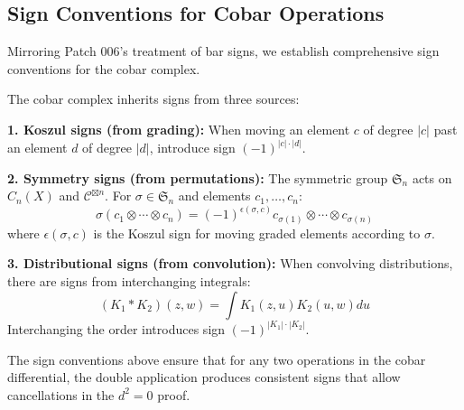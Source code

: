 \subsection{Sign Conventions for Cobar Operations}

Mirroring Patch 006's treatment of bar signs, we establish comprehensive sign 
conventions for the cobar complex.

\begin{convention}\label{conv:cobar-signs}
The cobar complex inherits signs from three sources:

\textbf{1. Koszul signs (from grading):}
When moving an element $c$ of degree $|c|$ past an element $d$ of degree $|d|$, 
introduce sign $(-1)^{|c| \cdot |d|}$.

\textbf{2. Symmetry signs (from permutations):}
The symmetric group $\mathfrak{S}_n$ acts on $C_n(X)$ and $\mathcal{C}^{\boxtimes n}$. 
For $\sigma \in \mathfrak{S}_n$ and elements $c_1, \ldots, c_n$:
$$\sigma(c_1 \otimes \cdots \otimes c_n) = (-1)^{\epsilon(\sigma, c)} 
c_{\sigma(1)} \otimes \cdots \otimes c_{\sigma(n)}$$
where $\epsilon(\sigma, c)$ is the Koszul sign for moving graded elements according 
to $\sigma$.

\textbf{3. Distributional signs (from convolution):}
When convolving distributions, there are signs from interchanging integrals:
$$(K_1 * K_2)(z, w) = \int K_1(z, u) K_2(u, w) du$$
Interchanging the order introduces sign $(-1)^{|K_1| \cdot |K_2|}$.
\end{convention}

\begin{lemma}\label{lem:cobar-sign-consistency}
The sign conventions above ensure that for any two operations in the cobar differential, 
the double application produces consistent signs that allow cancellations in the 
$d^2 = 0$ proof.
\end{lemma}

